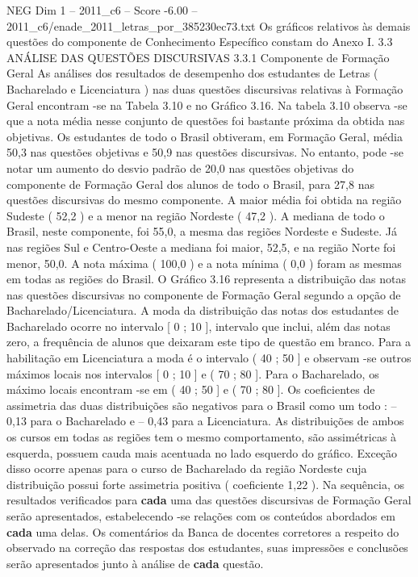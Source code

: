 \begin{textsample}{NEG Dim 1 – 2011\_c6 – Score -6.00 – 2011\_c6/enade\_2011\_letras\_por\_385230ec73.txt}
Os gráficos relativos às demais questões do componente de Conhecimento Específico constam do Anexo I. 3.3 ANÁLISE DAS QUESTÕES DISCURSIVAS 3.3.1 Componente de Formação Geral As análises dos resultados de desempenho dos estudantes de Letras ( Bacharelado e Licenciatura ) nas duas questões discursivas relativas à Formação Geral encontram -se na Tabela 3.10 e no Gráfico 3.16.
Na tabela 3.10 observa -se que a nota média nesse conjunto de questões foi bastante próxima da obtida nas objetivas.
Os estudantes de todo o Brasil obtiveram, em Formação Geral, média 50,3 nas questões objetivas e 50,9 nas questões discursivas.
No entanto, pode -se notar um aumento do desvio padrão de 20,0 nas questões objetivas do componente de Formação Geral dos alunos de todo o Brasil, para 27,8 nas questões discursivas do mesmo componente.
A maior média foi obtida na região Sudeste ( 52,2 ) e a menor na região Nordeste ( 47,2 ).
A mediana de todo o Brasil, neste componente, foi 55,0, a mesma das regiões Nordeste e Sudeste.
Já nas regiões Sul e Centro-Oeste a mediana foi maior, 52,5, e na região Norte foi menor, 50,0.
A nota máxima ( 100,0 ) e a nota mínima ( 0,0 ) foram as mesmas em todas as regiões do Brasil.
O Gráfico 3.16 representa a distribuição das notas nas questões discursivas no componente de Formação Geral segundo a opção de Bacharelado/Licenciatura.
A moda da distribuição das notas dos estudantes de Bacharelado ocorre no intervalo [ 0 ; 10 ], intervalo que inclui, além das notas zero, a frequência de alunos que deixaram este tipo de questão em branco.
Para a habilitação em Licenciatura a moda é o intervalo ( 40 ; 50 ] e observam -se outros máximos locais nos intervalos [ 0 ; 10 ] e ( 70 ; 80 ].
Para o Bacharelado, os máximo locais encontram -se em ( 40 ; 50 ] e ( 70 ; 80 ].
Os coeficientes de assimetria das duas distribuições são negativos para o Brasil como um todo : – 0,13 para o Bacharelado e – 0,43 para a Licenciatura.
As distribuições de ambos os cursos em todas as regiões tem o mesmo comportamento, são assimétricas à esquerda, possuem cauda mais acentuada no lado esquerdo do gráfico.
Exceção disso ocorre apenas para o curso de Bacharelado da região Nordeste cuja distribuição possui forte assimetria positiva ( coeficiente 1,22 ).
Na sequência, os resultados verificados para \textbf{cada} uma das questões discursivas de Formação Geral serão apresentados, estabelecendo -se relações com os conteúdos abordados em \textbf{cada} uma delas.
Os comentários da Banca de docentes corretores a respeito do observado na correção das respostas dos estudantes, suas impressões e conclusões serão apresentados junto à análise de \textbf{cada} questão.

\end{textsample}
